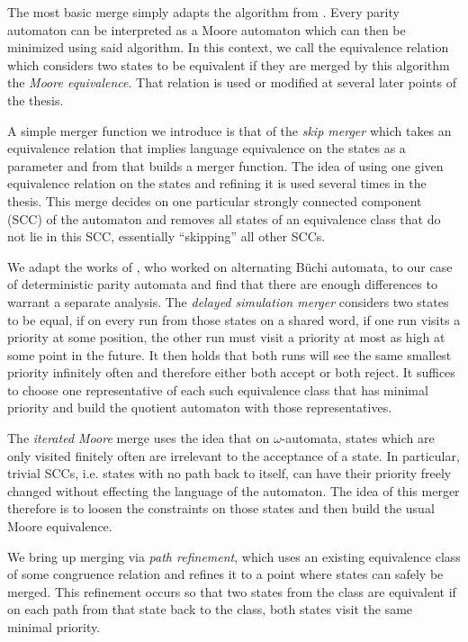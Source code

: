 The most basic merge simply adapts the algorithm from \cite{Hopcroft1971}. Every parity automaton can be interpreted as a Moore automaton which can then be minimized using said algorithm. In this context, we call the equivalence relation which considers two states to be equivalent if they are merged by this algorithm the \emph{Moore equivalence}. That relation is used or modified at several later points of the thesis.

A simple merger function we introduce is that of the \emph{skip merger} which takes an equivalence relation that implies language equivalence on the states as a parameter and from that builds a merger function. The idea of using one given equivalence relation on the states and refining it is used several times in the thesis. This merge decides on one particular strongly connected component (SCC) of the automaton and removes all states of an equivalence class that do not lie in this SCC, essentially \enquote{skipping} all other SCCs.

We adapt the works of \cite{FritzWilke06}, who worked on alternating Büchi automata, to our case of deterministic parity automata and find that there are enough differences to warrant a separate analysis. The \emph{delayed simulation merger} considers two states to be equal, if on every run from those states on a shared word, if one run visits a priority at some position, the other run must visit a priority at most as high at some point in the future. It then holds that both runs will see the same smallest priority infinitely often and therefore either both accept or both reject. It suffices to choose one representative of each such equivalence class that has minimal priority and build the quotient automaton with those representatives.

The \emph{iterated Moore} merge uses the idea that on $\omega$-automata, states which are only visited finitely often are irrelevant to the acceptance of a state. In particular, trivial SCCs, i.e. states with no path back to itself, can have their priority freely changed without effecting the language of the automaton. The idea of this merger therefore is to loosen the constraints on those states and then build the usual Moore equivalence.

We bring up merging via \emph{path refinement}, which uses an existing equivalence class of some congruence relation and refines it to a point where states can safely be merged. This refinement occurs so that two states from the class are equivalent if on each path from that state back to the class, both states visit the same minimal priority. 

